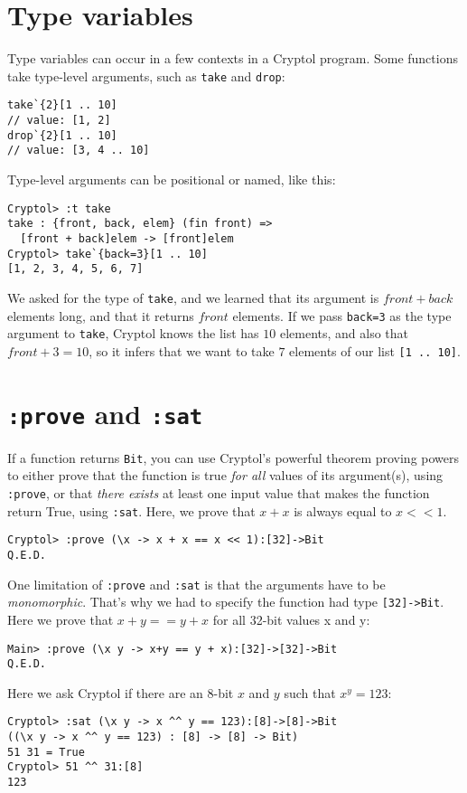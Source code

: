 \documentclass[9pt,letter]{article}
\begin{document}
\section{Type variables}
Type variables can occur in a few contexts in a Cryptol program.
Some functions take type-level arguments, such as \verb+take+ and \verb+drop+:
\begin{verbatim}
take`{2}[1 .. 10]
// value: [1, 2]
drop`{2}[1 .. 10]
// value: [3, 4 .. 10]
\end{verbatim}
Type-level arguments can be positional or named, like this:
\begin{verbatim}
Cryptol> :t take
take : {front, back, elem} (fin front) => 
  [front + back]elem -> [front]elem
Cryptol> take`{back=3}[1 .. 10]
[1, 2, 3, 4, 5, 6, 7]
\end{verbatim}
We asked for the type of \verb+take+, and we learned that its argument is $front+back$ elements long, and that it returns $front$ elements. If we pass \verb+back=3+ as the type argument to \verb+take+, Cryptol knows the list has $10$ elements, and also that $front+3=10$, so it infers that we want to take $7$ elements of our list \verb+[1 .. 10]+.

\section{{\tt :prove} and {\tt :sat}}
If a function returns \verb+Bit+, you can use Cryptol's powerful theorem proving powers to either prove that the function is true {\em for all} values of its argument(s), using \verb+:prove+, or that {\em there exists} at least one input value that makes the function return True, using \verb+:sat+. Here, we prove that $x + x$ is always equal to $x << 1$.
\begin{verbatim}
Cryptol> :prove (\x -> x + x == x << 1):[32]->Bit
Q.E.D.
\end{verbatim}

One limitation of {\tt :prove} and {\tt :sat} is that the arguments have to be {\em monomorphic}. That's why we had to specify the function had type \verb+[32]->Bit+. Here we prove that $x+y == y+x$ for all 32-bit values x and y:
\begin{verbatim}
Main> :prove (\x y -> x+y == y + x):[32]->[32]->Bit
Q.E.D.
\end{verbatim}
Here we ask Cryptol if there are an 8-bit $x$ and $y$ such that $x^y = 123$:
\begin{verbatim}
Cryptol> :sat (\x y -> x ^^ y == 123):[8]->[8]->Bit
((\x y -> x ^^ y == 123) : [8] -> [8] -> Bit) 
51 31 = True
Cryptol> 51 ^^ 31:[8]
123
\end{verbatim}
\end{document}
